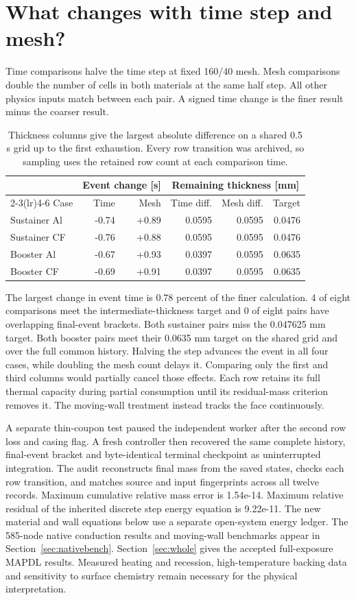 \documentclass[11pt]{article}
\begin{document}
\section{What changes with time step and mesh?}
Time comparisons halve the time step at fixed 160/40 mesh. Mesh comparisons
double the number of cells in both materials at the same half step.
All other physics inputs match between each pair. A signed time change is
the finer result minus the coarser result.
\begin{table}[H]\centering
\begin{tabular}{lrr rrr}\toprule
 & \multicolumn{2}{c}{Event change [s]} & \multicolumn{3}{c}{Remaining thickness [mm]}\\
\cmidrule(lr){2-3}\cmidrule(lr){4-6}
Case & Time & Mesh & Time diff. & Mesh diff. & Target\\\midrule
Sustainer Al & -0.74 & +0.89 & 0.0595 & 0.0595 & 0.0476 \\
Sustainer CF & -0.76 & +0.88 & 0.0595 & 0.0595 & 0.0476 \\
Booster Al & -0.67 & +0.93 & 0.0397 & 0.0595 & 0.0635 \\
Booster CF & -0.69 & +0.91 & 0.0397 & 0.0595 & 0.0635 \\
\bottomrule\end{tabular}
\caption{Thickness columns give the largest absolute difference on a shared
0.5 s grid up to the first exhaustion. Every row transition was archived, so
sampling uses the retained row count at each comparison time.}
\end{table}
The largest change in event time is 0.78 percent of the finer calculation.
4 of eight comparisons meet the intermediate-thickness target and
0 of eight pairs have overlapping final-event brackets.
Both sustainer pairs miss the 0.047625 mm target. Both booster pairs meet
their 0.0635 mm target on the shared grid and over the full common history.
Halving the step advances the event in all four cases, while doubling the
mesh count delays it. Comparing only the first and third columns would
partially cancel those effects. Each row retains its full thermal capacity during partial consumption
until its residual-mass criterion removes it. The moving-wall treatment instead tracks the face continuously.

A separate thin-coupon test paused the independent worker after the second row
loss and casing flag. A fresh controller then recovered the same complete
history, final-event bracket and byte-identical terminal checkpoint as uninterrupted
integration. The audit reconstructs final mass from the saved states, checks each row
transition, and matches source and input fingerprints across all twelve records.
Maximum cumulative relative mass error is 1.54e-14. Maximum relative residual
of the inherited discrete step energy equation is 9.22e-11. The new material
and wall equations below use a separate open-system energy ledger.
The 585-node native conduction results and moving-wall benchmarks appear in Section~\ref{sec:nativebench}. Section~\ref{sec:whole} gives the accepted full-exposure MAPDL results.
Measured heating and recession, high-temperature backing data and sensitivity
to surface chemistry remain necessary for the physical interpretation.
\end{document}
